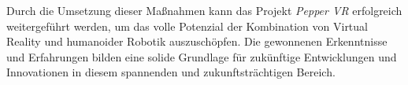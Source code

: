 \noindent
Durch die Umsetzung dieser Maßnahmen kann das Projekt \textit{Pepper VR} erfolgreich weitergeführt werden, um das volle Potenzial der Kombination von Virtual Reality und humanoider Robotik auszuschöpfen. Die gewonnenen Erkenntnisse und Erfahrungen bilden eine solide Grundlage für zukünftige Entwicklungen und Innovationen in diesem spannenden und zukunftsträchtigen Bereich.
